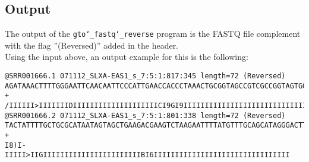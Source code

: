 \subsection*{Output}
The output of the \texttt{gto\char`_fastq\char`_reverse} program is the FASTQ file complement with the flag ''(Reversed)'' added in the header.\\
Using the input above, an output example for this is the following:
\begin{lstlisting}
@SRR001666.1 071112_SLXA-EAS1_s_7:5:1:817:345 length=72 (Reversed)
AGATAAACTTTTGGGAATTCAACAATTCCCATTGAACCACCCTAAACTGCGGTAGCCGTCGCCGGTAGTGGG
+
/IIIIII>IIIIIIIDIIIIIIIIIIIIIIIIIIIICI9GI9IIIIIIIIIIIIIIIIIIIIIIIIIIIIII
@SRR001666.2 071112_SLXA-EAS1_s_7:5:1:801:338 length=72 (Reversed)
TACTATTTTGCTGCGCATAATAGTAGCTGAAGACGAAGTCTAAGAATTTTATGTTTGCAGCATAGGGACTTG
+
I8)I-IIIII>IIGIIIIIIIIIIIIIIIIIIIIIIIBI6IIIIIIIIIIIIIIIIIIIIIIIIIIIIIIII
\end{lstlisting}